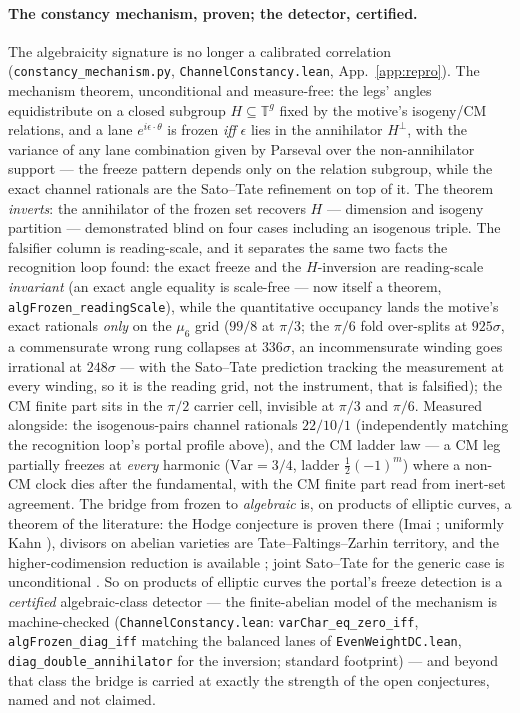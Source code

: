 \documentclass[11pt]{article}
\theoremstyle{definition}
\theoremstyle{remark}
\begin{document}
\paragraph{The constancy mechanism, proven; the detector, certified.} The
algebraicity signature is no longer a calibrated correlation
(\texttt{constancy\_mechanism.py}, \texttt{ChannelConstancy.lean},
App.~\ref{app:repro}). The mechanism theorem, unconditional and
measure-free: the legs' angles equidistribute on a closed subgroup
$H\subseteq\mathbb T^g$ fixed by the motive's isogeny/CM relations, and a
lane $e^{i\epsilon\cdot\theta}$ is frozen \emph{iff} $\epsilon$ lies in the
annihilator $H^\perp$, with the variance of any lane combination given by
Parseval over the non-annihilator support --- the freeze pattern depends
only on the relation subgroup, while the exact channel rationals are the
Sato--Tate refinement on top of it. The theorem \emph{inverts}: the
annihilator of the frozen set recovers $H$ --- dimension and isogeny
partition --- demonstrated blind on four cases including an isogenous
triple. The falsifier column is reading-scale, and it separates the same
two facts the recognition loop found: the exact freeze and the $H$-inversion
are reading-scale \emph{invariant} (an exact angle equality is scale-free
--- now itself a theorem, \texttt{algFrozen\_readingScale}), while the
quantitative occupancy lands the motive's exact rationals \emph{only} on
the $\mu_6$ grid ($99/8$ at $\pi/3$; the $\pi/6$ fold over-splits at
$925\sigma$, a commensurate wrong rung collapses at $336\sigma$, an
incommensurate winding goes irrational at $248\sigma$ --- with the
Sato--Tate prediction tracking the measurement at every winding, so it is
the reading grid, not the instrument, that is falsified); the CM finite
part sits in the $\pi/2$ carrier cell, invisible at $\pi/3$ and $\pi/6$. Measured alongside:
the isogenous-pairs channel rationals $22/10/1$ (independently matching the
recognition loop's portal profile above), and the CM ladder law --- a CM
leg partially freezes at \emph{every} harmonic ($\mathrm{Var}=3/4$, ladder
$\tfrac12(-1)^m$) where a non-CM clock dies after the fundamental, with the
CM finite part read from inert-set agreement. The bridge from frozen to
\emph{algebraic} is, on products of elliptic curves, a theorem of the
literature: the Hodge conjecture is proven there (Imai \cite{Imai};
uniformly Kahn \cite{KahnHodge}), divisors on abelian varieties are
Tate--Faltings--Zarhin territory, and the higher-codimension reduction is
available \cite{LiZhangTate}; joint Sato--Tate for the generic case is
unconditional \cite{BLGHT}. So on products of elliptic curves the portal's
freeze detection is a \emph{certified} algebraic-class detector --- the
finite-abelian model of the mechanism is machine-checked
(\texttt{ChannelConstancy.lean}: \texttt{varChar\_eq\_zero\_iff},
\texttt{algFrozen\_diag\_iff} matching the balanced lanes of
\texttt{EvenWeightDC.lean}, \texttt{diag\_double\_annihilator} for the
inversion; standard footprint) --- and beyond that class the bridge is
carried at exactly the strength of the open conjectures, named and not
claimed.
\end{document}
